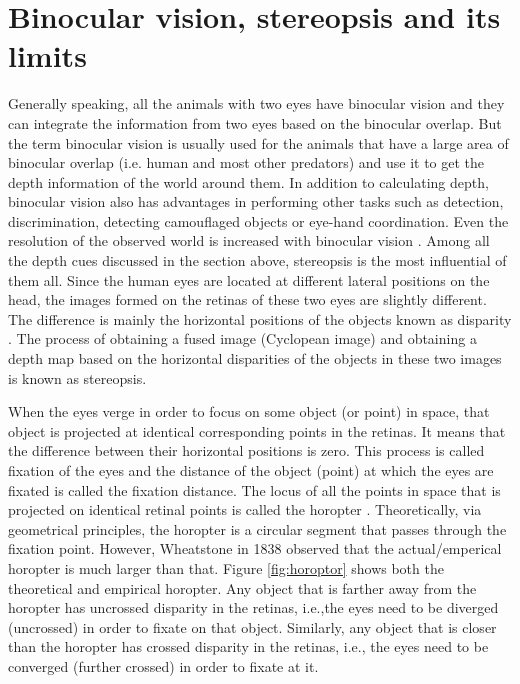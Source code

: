 \section{Binocular vision, stereopsis and its limits}
Generally speaking, all the animals with two eyes have binocular vision and they can integrate the information from two eyes based on the binocular overlap. But the term binocular vision is usually used for the animals that have a large area of binocular overlap (i.e. human and most other predators) and use it to get the depth information of the world around them. In addition to calculating depth, binocular vision also has advantages in performing other tasks such as detection, discrimination, detecting camouflaged objects or eye-hand coordination. Even the resolution of the observed world is increased with binocular vision \cite{howard1995binocular}. Among all the depth cues discussed in the section above, stereopsis is the most influential of them all. Since the human eyes are located at different lateral positions on the head, the images formed on the retinas of these two eyes are slightly different. The difference is mainly the horizontal positions of the objects known as disparity \cite{ wiki:stereopsis}. The process of obtaining a fused image (Cyclopean image) and obtaining a depth map based on the horizontal disparities of the objects in these two images is known as stereopsis.

When the eyes verge in order to focus on some object (or point) in space, that object is projected at identical corresponding points in the retinas. It means that the difference between their horizontal positions is zero. This process is called fixation of the eyes and the distance of the object (point) at which the eyes are fixated is called the fixation distance. The locus of all the points in space that is projected on identical retinal points is called the horopter \cite{ wiki:horoptor}. Theoretically, via geometrical principles, the horopter is a circular segment that passes through the fixation point. However, Wheatstone in 1838 observed that the actual/emperical horopter is much larger than that. Figure \ref{fig:horoptor} shows both the theoretical and empirical horopter. Any object that is farther away from the horopter has uncrossed disparity in the retinas, i.e.,the eyes need to be diverged (uncrossed) in order to fixate on that object. Similarly, any object that is closer than the horopter has crossed disparity in the retinas, i.e., the eyes need to be converged (further crossed) in order to fixate at it.

